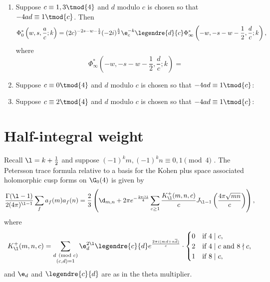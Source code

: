 \documentclass[12pt]{article}
\begin{document}
    \begin{enumerate}
      \item Suppose \(c \equiv 1,3 \tmod{4}\) and \(d\) modulo \(c\) is chosen so that \(-4ad \equiv 1 \tmod{c}\). Then
      \[
        \Phi_{0}^{\ast}\left(w,s,\frac{a}{c};k\right) = (2c)^{-2s-w-\frac{1}{2}}(-2i)^{\frac{k}{2}}\e_{c}^{-k}\legendre{d}{c}\Phi_{\infty}^{\ast}\left(-w,-s-w-\frac{1}{2},\frac{d}{c};k\right),
      \]
      where
      \[
        \Phi_{\infty}^{\ast}\left(-w,-s-w-\frac{1}{2},\frac{d}{c};k\right) = 
      \]
      
      \item Suppose \(c \equiv 0 \tmod{4}\) and \(d\) modulo \(c\) is chosen so that \(-4ad \equiv 1 \tmod{c}\):
      \item Suppose \(c \equiv 2 \tmod{4}\) and \(d\) modulo \(c\) is chosen so that \(-4ad \equiv 1 \tmod{c}\):
    \end{enumerate}
\section{Half-integral weight}
    Recall \(\l = k+\frac{1}{2}\) and suppose \((-1)^{k}m,(-1)^{k}n \equiv 0,1 \pmod{4}\) . The Petersson trace formula relative to a basis for the Kohen plus space associated holomorphic cusp forms on \(\G_{0}(4)\) is given by
    \[\frac{\Gamma(\l-1)}{2(4\pi)^{\l-1}}\sum_{f}a_{f}(m)a_{f}(n) = \frac{2}{3}\left(\d_{m,n}+2\pi e^{-\frac{2\pi i\l}{4}}\sum_{c \ge 1}\frac{K_{\l}^{+}(m,n,c)}{c}J_{\l-1}\left(\frac{4\pi\sqrt{mn}}{c}\right)\right),\]
    where
    \[K_{\l}^{+}(m,n,c) = \sum_{\substack{d \pmod{c} \\ (c,d) = 1}}\e_{d}^{2\l}\legendre{c}{d}e^{\frac{2\pi i(md+n\overline{d})}{c}}\cdot\begin{cases} 0 & \text{if \(4 \mid c\)}, \\ 2 & \text{if \(4 \mid c\) and \(8 \nmid c\)}, \\ 1 & \text{if \(8 \mid c\)}, \end{cases}\]
    and \(\e_{d}\) and \(\legendre{c}{d}\) are as in the theta multiplier. 
\end{document}
